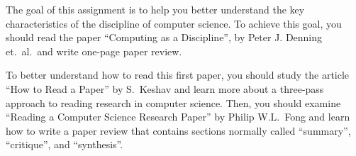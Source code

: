 



The goal of this assignment is to help you better understand the key characteristics of the discipline of computer
science. To achieve this goal, you should read the paper ``Computing as a Discipline'', by Peter J. Denning et.\ al.\
and write one-page paper review.

To better understand how to read this first paper, you should study the article ``How to Read a Paper'' by S.\ Keshav
and learn more about a three-pass approach to reading research in computer science. Then, you should examine ``Reading a
Computer Science Research Paper'' by Philip W.L.\ Fong and learn how to write a paper review that contains sections
normally called ``summary'', ``critique'', and ``synthesis''.







